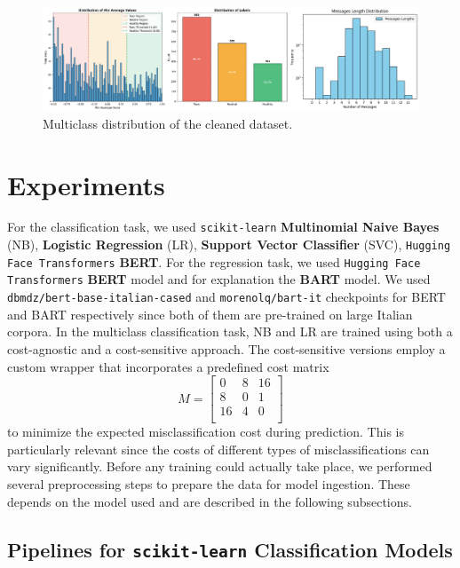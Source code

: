 \documentclass[twocolumn]{ceurart}
\begin{document}
\begin{figure}
    \centering
    \includegraphics[width=\linewidth]{rsc/multiclass_distributions.png} 
    \caption{Multiclass distribution of the cleaned dataset.}
    \label{fig:multiclass_distribution}
\end{figure}

\section{Experiments}

For the classification task, we used \texttt{scikit-learn} \textbf{Multinomial Naive Bayes} (NB), \textbf{Logistic Regression} (LR), \textbf{Support Vector Classifier} (SVC), \texttt{Hugging Face Transformers} \textbf{BERT}. For the regression task, we used \texttt{Hugging Face Transformers} \textbf{BERT} model and for explanation the \textbf{BART} model. We used \texttt{dbmdz/bert-base-italian-cased} and \texttt{morenolq/bart-it} checkpoints for BERT and BART respectively since both of them are pre-trained on large Italian corpora. In the multiclass classification task, NB and LR are trained using both a cost-agnostic and a cost-sensitive approach. The cost-sensitive versions employ a custom wrapper that incorporates a predefined cost matrix%
%
\[
M =
\begin{bmatrix}
0 & 8 & 16 \\
8 & 0 & 1 \\
16 & 4 & 0 \\
\end{bmatrix}%
\]
%
to minimize the expected misclassification cost during prediction. This is particularly relevant since the costs of different types of misclassifications can vary significantly. Before any training could actually take place, we performed several preprocessing steps to prepare the data for model ingestion. These depends on the model used and are described in the following subsections.

\subsection{Pipelines for \texttt{scikit-learn} Classification Models}
\end{document}
